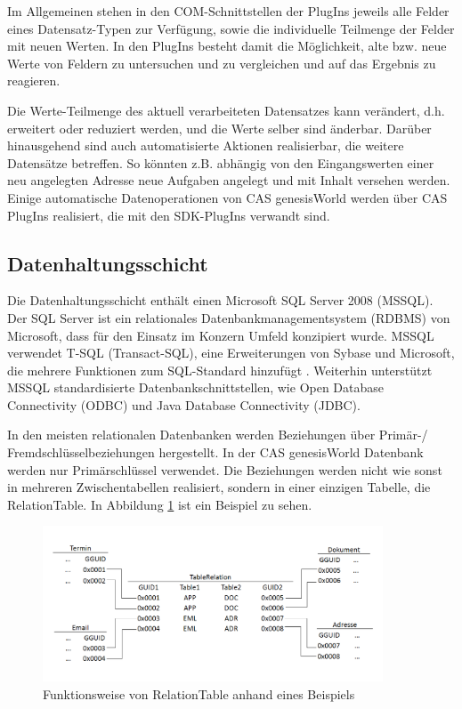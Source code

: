 Im Allgemeinen stehen in den COM-Schnittstellen der PlugIns jeweils alle Felder eines Datensatz-Typen zur Verfügung, sowie die individuelle Teilmenge der Felder mit neuen Werten. In den PlugIns besteht damit die Möglichkeit, alte bzw. neue Werte von Feldern zu untersuchen und zu vergleichen und auf das Ergebnis zu reagieren.

Die Werte-Teilmenge des aktuell verarbeiteten Datensatzes kann verändert, d.h. erweitert oder reduziert werden, und die Werte selber sind änderbar. Darüber hinausgehend sind auch automatisierte Aktionen realisierbar, die weitere Datensätze betreffen. So könnten z.B. abhängig von den Eingangswerten einer neu angelegten Adresse neue Aufgaben angelegt und mit Inhalt versehen werden. Einige automatische Datenoperationen von CAS genesisWorld werden über CAS PlugIns realisiert, die mit den SDK-PlugIns verwandt sind.

\subsection{Datenhaltungsschicht}
\label{ch:Systemanalyse:sec:genesisWorld:subsec:db}

Die Datenhaltungsschicht enthält einen Microsoft SQL Server 2008 (MSSQL). Der SQL Server ist ein relationales Datenbankmanagementsystem (RDBMS) von Microsoft, dass für den Einsatz im Konzern Umfeld konzipiert wurde. MSSQL verwendet T-SQL (Transact-SQL), eine Erweiterungen von Sybase und Microsoft, die mehrere Funktionen zum SQL-Standard hinzufügt \cite{tech2013}. Weiterhin unterstützt MSSQL standardisierte Datenbankschnittstellen, wie Open Database Connectivity (ODBC) und Java Database Connectivity (JDBC).
  
In den meisten relationalen Datenbanken werden Beziehungen über Primär-/ Fremdschlüsselbeziehungen hergestellt. In der CAS genesisWorld Datenbank werden nur Primärschlüssel verwendet. Die Beziehungen werden nicht wie sonst in mehreren Zwischentabellen realisiert, sondern in einer einzigen Tabelle, die RelationTable. In Abbildung \ref{gw_2} ist ein Beispiel zu sehen.

\begin{figure}[ht]
	\centering
  \includegraphics[width=0.9\textwidth, width=0.9\textwidth]{pics/gW_tablerealtion.png}
	\caption{Funktionsweise von RelationTable anhand eines Beispiels}
	\label{gw_2}
\end{figure}

